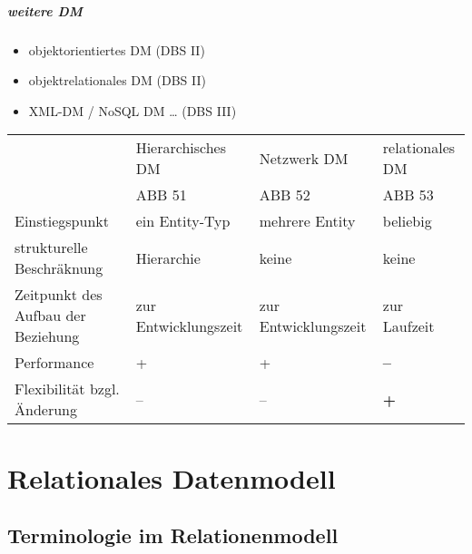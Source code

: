 \paragraph{weitere DM}
\begin{itemize}
\item objektorientiertes DM (DBS II)
\item objektrelationales DM (DBS II)
\item XML-DM / NoSQL DM … (DBS III)
\end{itemize}

\begin{tabular}{
>{\raggedright} p{} |
>{\raggedright} p{} |
>{\raggedright} p{} |
>{\raggedright} p{} 
}
& Hierarchisches DM & Netzwerk DM & relationales DM\tabularnewline
& ABB 51 & ABB 52 & ABB 53 \tabularnewline
\hline
Einstiegspunkt & ein Entity-Typ & mehrere Entity & beliebig\tabularnewline
strukturelle Beschräknung & Hierarchie & keine & keine \tabularnewline
Zeitpunkt des Aufbau der Beziehung & zur Entwicklungszeit & zur Entwicklungszeit & zur Laufzeit \tabularnewline
Performance & + & + & \Large{\textbf{--}}\tabularnewline
Flexibilität bzgl. Änderung & -- & -- & \Large{\textbf{+}}
\end{tabular}
\chapter{Relationales Datenmodell}
\section{Terminologie im Relationenmodell}

